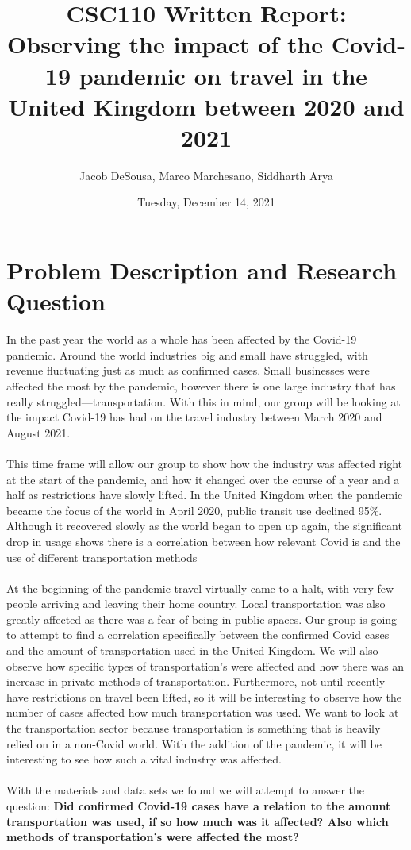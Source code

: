 \documentclass[fontsize=11pt]{article}
\title{CSC110 Written Report: Observing the impact of the Covid-19 pandemic on travel in the United Kingdom between 2020 and 2021}
\author{Jacob DeSousa, Marco Marchesano, Siddharth Arya}
\date{Tuesday, December 14, 2021}
\begin{document}
  
\maketitle  
  
\section*{Problem Description and Research Question}  
  
In the past year the world as a whole has been affected by the Covid-19 pandemic. Around the world industries big and small have struggled, with revenue fluctuating just as much as confirmed cases. Small businesses were affected the most by the pandemic, however there is one large industry that has really struggled—transportation. With this in mind, our group will be looking at the impact Covid-19 has had on the travel industry between March 2020 and August 2021.
\\ \\
This time frame will allow our group to show how the industry was affected right at the start of the pandemic, and how it changed over the course of a year and a half as restrictions have slowly lifted. In the United Kingdom when the pandemic became the focus of the world in April 2020, public transit use declined 95\%. Although it recovered slowly as the world began to open up again, the significant drop in usage shows there is a correlation between how relevant Covid is and the use of different transportation methods
\\ \\
At the beginning of the pandemic travel virtually came to a halt, with very few people arriving and leaving their home country. Local transportation was also greatly affected as there was a fear of being in public spaces. Our group is going to attempt to find a correlation specifically between the confirmed Covid cases and the amount of transportation used in the United Kingdom. We will also observe how specific types of transportation's were affected and how there was an increase in private methods of transportation. Furthermore, not until recently have restrictions on travel been lifted, so it will be interesting to observe how the number of cases affected how much transportation was used. We want to look at the transportation sector because transportation is something that is heavily relied on in a non-Covid world. With the addition of the pandemic, it will be interesting to see how such a vital industry was affected.
\\ \\
With the materials and data sets we found we will attempt to answer the question: \textbf{Did confirmed Covid-19 cases have a relation to the amount transportation was used, if so how much was it affected? Also which methods of transportation's were affected the most? }
\end{document}

